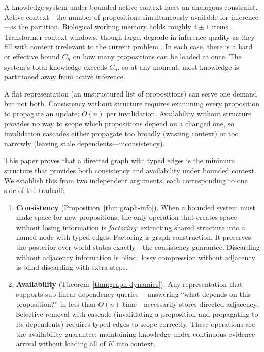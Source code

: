 \documentclass[11pt]{article}
\theoremstyle{definition}
\begin{document}
A knowledge system under bounded active context faces an analogous
constraint. Active context---the number of propositions simultaneously
available for inference---is the partition. Biological working memory holds
roughly $4 \pm 1$ items \cite{Cowan2001}. Transformer context windows,
though large, degrade in inference quality as they fill with content
irrelevant to the current problem \cite{Liu2024}. In each case,
there is a hard or effective bound $C_n$ on how many propositions can
be loaded at once. The system's total knowledge exceeds $C_n$, so at
any moment, most knowledge is partitioned away from active inference.

A flat representation (an unstructured list of propositions) can
serve one demand but not both. Consistency without structure requires
examining every proposition to propagate an update: $O(n)$ per
invalidation. Availability without structure provides no way to scope
which propositions depend on a changed one, so invalidation cascades
either propagate too broadly (wasting context) or too narrowly
(leaving stale dependents---inconsistency).

This paper proves that a directed graph with typed edges is the
minimum structure that provides both consistency and availability
under bounded context. We establish this from two independent
arguments, each corresponding to one side of the tradeoff:

\begin{enumerate}
\item \textbf{Consistency} (Proposition~\ref{thm:graph-info}).
   When a bounded system must make space for new propositions, the only
   operation that creates space without losing information is
   \emph{factoring}: extracting shared structure into a named node with
   typed edges. Factoring is graph construction. It preserves the
   posterior over world states exactly---the consistency guarantee.
   Discarding without adjacency information is blind; lossy compression
   without adjacency is blind discarding with extra steps.

\item \textbf{Availability} (Theorem~\ref{thm:graph-dynamics}).
   Any representation that supports sub-linear dependency queries---
   answering ``what depends on this proposition?'' in less than $O(n)$
   time---necessarily stores directed adjacency. Selective removal
   with cascade (invalidating a proposition and propagating to its
   dependents) requires typed edges to scope correctly. These
   operations are the availability guarantee: maintaining knowledge
   under continuous evidence arrival without loading all of $K$ into
   context.
\end{enumerate}
\end{document}
